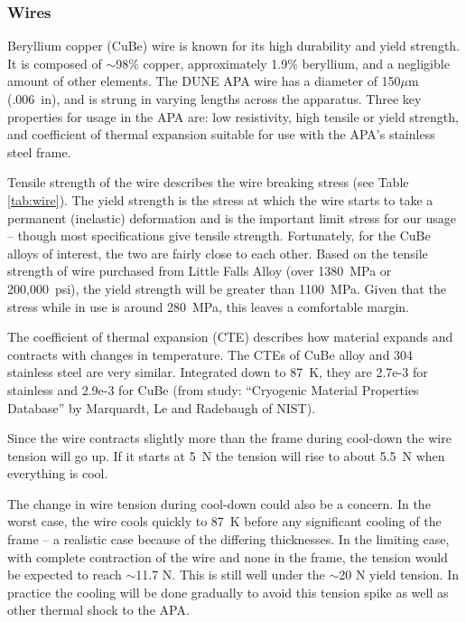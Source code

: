 \subsubsection{Wires}
\label{subsec:apa_wires}

Beryllium copper (CuBe) wire is known for its high durability and yield strength. It is composed of $\sim$98$\%$ copper, approximately 1.9$\%$ beryllium, and a negligible amount of other elements. The DUNE APA wire has a diameter of 150$\mu$m (.006~in), and is strung in varying lengths across the apparatus. Three key properties for usage in the APA are: low resistivity, high tensile or yield strength, and coefficient of thermal expansion suitable for use with the APA's stainless steel frame.

Tensile strength of the wire describes the wire breaking stress (see Table \ref{tab:wire}).  The yield strength is the stress at which the wire starts to take a permanent (inelastic) deformation and is the important limit stress for our usage -- though most specifications give tensile strength.  Fortunately, for the CuBe alloys of interest, the two are fairly close to each other.  Based on the tensile strength of wire purchased from Little Falls Alloy (over 1380~MPa or 200,000~psi), the yield strength will be greater than 1100~MPa.  Given that the stress while in use is around 280~MPa, this leaves a comfortable margin.

The coefficient of thermal expansion (CTE) describes how material expands and contracts with changes in temperature.  The CTEs of CuBe alloy and 304 stainless steel are very similar.  Integrated down to 87~K, they are 2.7e-3 for stainless and 2.9e-3 for CuBe  (from study: ``Cryogenic Material Properties Database'' by Marquardt, Le and Radebaugh of NIST).

Since the wire contracts slightly more than the frame during cool-down the wire tension will go up.  If it starts at 5~N the tension will rise to about 5.5~N when everything is cool.  

The change in wire tension during cool-down could also be a concern.  In the worst case, the wire
 cools quickly to 87~K before any significant cooling of the frame  -- a realistic case because of the differing thicknesses.  In the limiting case, with complete contraction of the wire and none in the frame, the tension would be expected to reach $\sim$11.7 N.  This is still well under the $\sim$20 N yield tension.
In practice the cooling will be done gradually to avoid this tension spike as well as other thermal shock to the APA.

